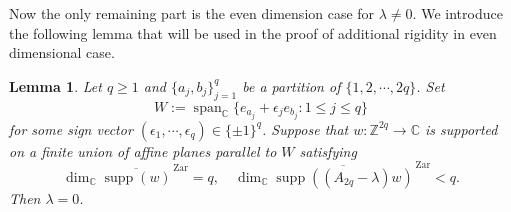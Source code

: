 \documentclass[11pt,reqno]{amsart}
\newcommand\Z{\ensuremath{\mathbb{Z}}}
\newcommand\C{\ensuremath{\mathbb{C}}}
\newcommand{\supp}{\operatorname{supp}}
\newtheorem{lemma}[theorem]{Lemma}
\theoremstyle{definition}
\theoremstyle{plain}
\numberwithin{equation}{section}
\begin{document}
Now the only remaining part is the even dimension case for $\lambda\neq 0$. 
We introduce the following lemma that will be used in the proof of additional rigidity in even dimensional case.
\begin{lemma}\label{lem:paired-layer-rigidity}
    Let $q\ge 1$ and $\lbrace a_j,b_j\rbrace_{j=1}^q$ be a partition of $\lbrace 1,2,\cdots,2q\rbrace$. Set
    \begin{equation*}
        W:=\operatorname{span}_\C\lbrace e_{a_j}+\epsilon_j e_{b_j}:1\le j\le q\rbrace 
    \end{equation*}
    for some sign vector $(\epsilon_1,\cdots,\epsilon_q)\in \lbrace \pm 1\rbrace^q$. Suppose that $w:\Z^{2q}\to \C$ is supported on a finite union of affine planes parallel to $W$ satisfying
    \begin{equation*}
        \dim_{\C}\overline{\supp(w)}^{\,\mathrm{Zar}}=q,\quad
 \dim_{\C}\overline{\supp((A_{2q}-\lambda)w)}^{\,\mathrm{Zar}}<q.
    \end{equation*}
    Then $\lambda=0$.
\end{lemma}
\end{document}
